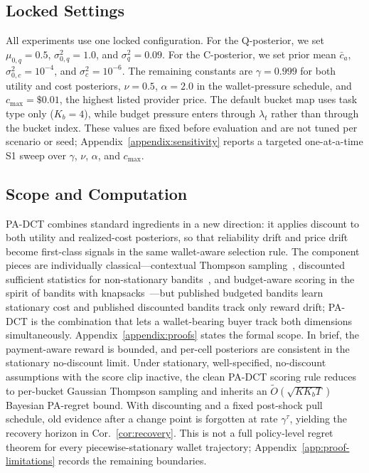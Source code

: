 \subsection{Locked Settings}
\label{sec:method-hyperparams}

All experiments use one locked configuration. For the Q-posterior, we set $\mu_{0,q}=0.5$, $\sigma^2_{0,q}=1.0$, and $\sigma^2_q=0.09$. For the C-posterior, we set prior mean $\bar c_a$, $\sigma^2_{0,c}=10^{-4}$, and $\sigma^2_c=10^{-6}$. The remaining constants are $\gamma=0.999$ for both utility and cost posteriors, $\nu=0.5$, $\alpha=2.0$ in the wallet-pressure schedule, and $c_{\max}=\$0.01$, the highest listed provider price. The default bucket map uses task type only ($K_b=4$), while budget pressure enters through $\lambda_t$ rather than through the bucket index. These values are fixed before evaluation and are not tuned per scenario or seed; Appendix~\ref{appendix:sensitivity} reports a targeted one-at-a-time S1 sweep over $\gamma$, $\nu$, $\alpha$, and $c_{\max}$.

\subsection{Scope and Computation}
\label{sec:method-theory}

PA-DCT combines standard ingredients in a new direction: it applies discount to both utility and realized-cost posteriors, so that reliability drift and price drift become first-class signals in the same wallet-aware selection rule. The component pieces are individually classical---contextual Thompson sampling~\citep{agrawal2013contextualts,russo2014learning}, discounted sufficient statistics for non-stationary bandits~\citep{garivier2011discounted,qi2023dsts}, and budget-aware scoring in the spirit of bandits with knapsacks~\citep{badanidiyuru2018bandits}---but published budgeted bandits learn stationary cost and published discounted bandits track only reward drift; PA-DCT is the combination that lets a wallet-bearing buyer track both dimensions simultaneously. Appendix~\ref{appendix:proofs} states the formal scope. In brief, the payment-aware reward is bounded, and per-cell posteriors are consistent in the stationary no-discount limit. Under stationary, well-specified, no-discount assumptions with the score clip inactive, the clean PA-DCT scoring rule reduces to per-bucket Gaussian Thompson sampling and inherits an $\tilde O(\sqrt{K K_b T})$ Bayesian PA-regret bound. With discounting and a fixed post-shock pull schedule, old evidence after a change point is forgotten at rate $\gamma^\tau$, yielding the recovery horizon in Cor.~\ref{cor:recovery}. This is not a full policy-level regret theorem for every piecewise-stationary wallet trajectory; Appendix~\ref{app:proof-limitations} records the remaining boundaries.

